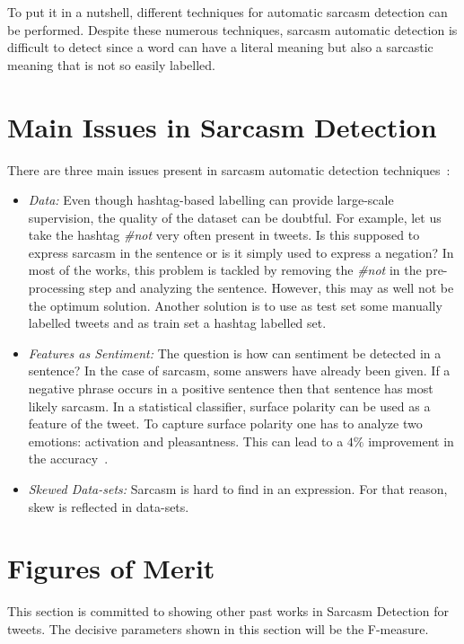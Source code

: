 To put it in a nutshell, different techniques for automatic sarcasm detection can be performed. Despite these numerous techniques, sarcasm automatic detection is difficult to detect since a word can have a literal meaning but also a sarcastic meaning that is not so easily labelled.

\section{Main Issues in Sarcasm Detection}
There are three main issues present in sarcasm automatic detection techniques~\cite{joshi2017automatic}:
\begin{itemize}
	\item \textit{Data:} Even though hashtag-based labelling can provide large-scale supervision, the quality of the dataset can be doubtful. For example, let us take the hashtag \textit{\#not} very often present in tweets. Is this supposed to express sarcasm in the sentence or is it simply used to express a negation? In most of the works, this problem is tackled by removing the \textit{\#not} in the pre-processing step and analyzing the sentence. However, this may as well not be the optimum solution. Another solution is to use as test set some manually labelled tweets and as train set a hashtag labelled set. 
	\item \textit{Features as Sentiment:} The question is how can sentiment be detected in a sentence? In the case of sarcasm, some answers have already been given. If a negative phrase occurs in a positive sentence then that sentence has most likely sarcasm. In a statistical classifier, surface polarity can be used as a feature of the tweet. To capture surface polarity one has to analyze two emotions: activation and pleasantness. This can lead to a $4\%$ improvement in the accuracy~\cite{joshi2017automatic}.
	\item \textit{Skewed Data-sets: }
	Sarcasm is hard to find in an expression. For that reason, skew is reflected in data-sets.
\end{itemize}

\section{Figures of Merit}
This section is committed to showing other past works in Sarcasm Detection for tweets. The decisive parameters shown in this section will be the F-measure.

